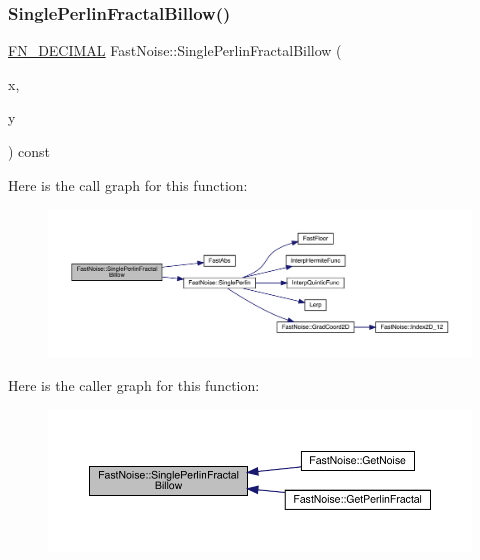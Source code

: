 \subsubsection{\texorpdfstring{Single\+Perlin\+Fractal\+Billow()}{SinglePerlinFractalBillow()}\hspace{0.1cm}{\footnotesize\ttfamily [1/2]}}
{\footnotesize\ttfamily \mbox{\hyperlink{_fast_noise_8h_a75a9ef6d2541c4921815b885bfd449c3}{F\+N\+\_\+\+D\+E\+C\+I\+M\+AL}} Fast\+Noise\+::\+Single\+Perlin\+Fractal\+Billow (\begin{DoxyParamCaption}\item[{\mbox{\hyperlink{_fast_noise_8h_a75a9ef6d2541c4921815b885bfd449c3}{F\+N\+\_\+\+D\+E\+C\+I\+M\+AL}}}]{x,  }\item[{\mbox{\hyperlink{_fast_noise_8h_a75a9ef6d2541c4921815b885bfd449c3}{F\+N\+\_\+\+D\+E\+C\+I\+M\+AL}}}]{y }\end{DoxyParamCaption}) const\hspace{0.3cm}{\ttfamily [private]}}

Here is the call graph for this function\+:
\nopagebreak
\begin{figure}[H]
\begin{center}
\leavevmode
\includegraphics[width=350pt]{d1/dd8/class_fast_noise_a7de7c8fe23437c93cc139193e48f3079_cgraph}
\end{center}
\end{figure}
Here is the caller graph for this function\+:
\nopagebreak
\begin{figure}[H]
\begin{center}
\leavevmode
\includegraphics[width=350pt]{d1/dd8/class_fast_noise_a7de7c8fe23437c93cc139193e48f3079_icgraph}
\end{center}
\end{figure}
\mbox{\label{class_fast_noise_a4e99adf451ddbd11a425a0909b2ae7e1}} 
